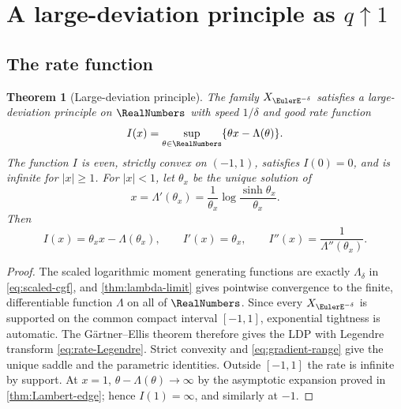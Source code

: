 \documentclass[11pt,a4paper]{article}
\newtheorem{theorem}{Theorem}[section]
\theoremstyle{definition}
\begin{document}
\section{A large-deviation principle as \texorpdfstring{$q\uparrow1$}{q tends to 1}}
\label{sec:LDP}

\subsection{The rate function}

\begin{theorem}[Large-deviation principle]
\label{thm:LDP}
The family $X_{\EulerE^{-\delta}}$ satisfies a large-deviation principle on $\RealNumbers$
with speed $1/\delta$ and good rate function
\begin{equation}
 I(x)=\sup_{\theta\in\RealNumbers}\{\theta x-\Lambda(\theta)\}.
 \label{eq:rate-Legendre}
\end{equation}
The function $I$ is even, strictly convex on $(-1,1)$, satisfies $I(0)=0$,
and is infinite for $|x|\ge1$.  For $|x|<1$, let $\theta_x$ be the unique
solution of
\begin{equation}
 x=\Lambda'(\theta_x)
 =\frac1{\theta_x}\log\frac{\sinh\theta_x}{\theta_x}.
 \label{eq:saddle-equation}
\end{equation}
Then
\begin{equation}
 I(x)=\theta_xx-\Lambda(\theta_x),
 \qquad I'(x)=\theta_x,
 \qquad I''(x)=\frac1{\Lambda''(\theta_x)}.
 \label{eq:rate-parametric}
\end{equation}
\end{theorem}

\begin{proof}
The scaled logarithmic moment generating functions are exactly
$\Lambda_\delta$ in \eqref{eq:scaled-cgf}, and
\cref{thm:lambda-limit} gives pointwise convergence to the finite,
differentiable function $\Lambda$ on all of $\RealNumbers$.  Since every
$X_{\EulerE^{-\delta}}$ is supported on the common compact interval $[-1,1]$,
exponential tightness is automatic.  The G\"artner--Ellis theorem \cite{Ellis1984,DemboZeitouni} therefore
gives the LDP with Legendre transform \eqref{eq:rate-Legendre}.  Strict
convexity and \eqref{eq:gradient-range} give the unique saddle and the
parametric identities.  Outside $[-1,1]$ the rate is infinite by support.
At $x=1$,
$\theta-\Lambda(\theta)\to\infty$ by the asymptotic expansion proved in
\cref{thm:Lambert-edge}; hence $I(1)=\infty$, and similarly at $-1$.
\end{proof}
\end{document}
